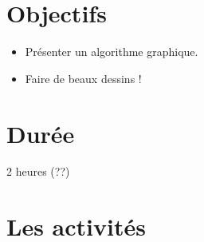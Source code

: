 \documentclass[class=report,crop=false, 12pt]{standalone}
\begin{document}



\section*{Objectifs}

\begin{itemize}
  \item Présenter un algorithme graphique.
  \item Faire de beaux dessins !
\end{itemize}


\section*{Durée}

2 heures (??)

\section*{Les activités}
\end{document}
